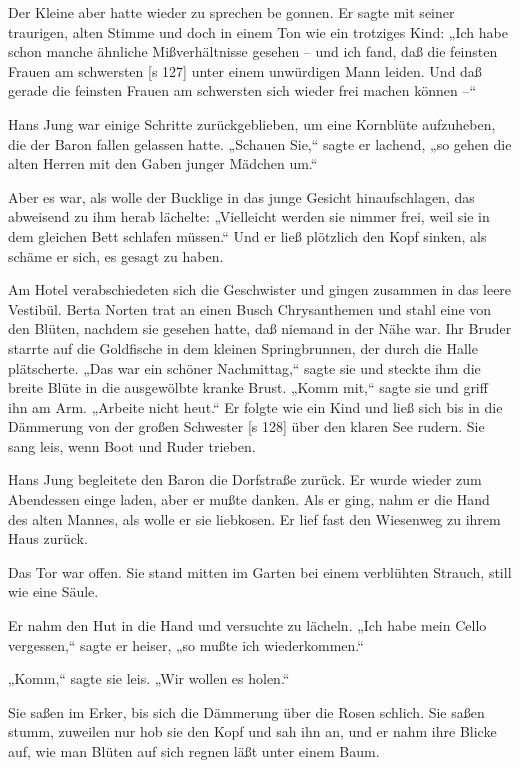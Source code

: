 Der Kleine aber hatte wieder zu sprechen be­
gonnen. Er sagte mit seiner traurigen, alten Stimme
und doch in einem Ton wie ein trotziges Kind: „Ich
habe schon manche ähnliche Mißverhältnisse gesehen
– und ich fand, daß die feinsten Frauen am schwersten
[s 127]
unter einem unwürdigen Mann leiden. Und daß
gerade die feinsten Frauen am schwersten sich wieder
frei machen können –“

Hans Jung war einige Schritte zurückgeblieben,
um eine Kornblüte aufzuheben, die der Baron fallen
gelassen hatte. „Schauen Sie,“ sagte er lachend,
„so gehen die alten Herren mit den Gaben junger
Mädchen um.“

Aber es war, als wolle der Bucklige in das junge
Gesicht hinaufschlagen, das abweisend zu ihm herab­
lächelte: „Vielleicht werden sie nimmer frei, weil sie
in dem gleichen Bett schlafen müssen.“ Und er ließ
plötzlich den Kopf sinken, als schäme er sich, es gesagt
zu haben.

Am Hotel verabschiedeten sich die Geschwister
und gingen zusammen in das leere Vestibül. Berta
Norten trat an einen Busch Chrysanthemen und stahl
eine von den Blüten, nachdem sie gesehen hatte, daß
niemand in der Nähe war. Ihr Bruder starrte auf
die Goldfische in dem kleinen Springbrunnen, der
durch die Halle plätscherte. „Das war ein schöner
Nachmittag,“ sagte sie und steckte ihm die breite
Blüte in die ausgewölbte kranke Brust. „Komm
mit,“ sagte sie und griff ihn am Arm. „Arbeite
nicht heut.“ Er folgte wie ein Kind und ließ sich
bis in die Dämmerung von der großen Schwester
[s 128]
über den klaren See rudern. Sie sang leis, wenn
Boot und Ruder trieben.

Hans Jung begleitete den Baron die Dorfstraße
zurück. Er wurde wieder zum Abendessen einge­
laden, aber er mußte danken. Als er ging, nahm er
die Hand des alten Mannes, als wolle er sie liebkosen.
Er lief fast den Wiesenweg zu ihrem Haus zurück.

Das Tor war offen. Sie stand mitten im Garten
bei einem verblühten Strauch, still wie eine Säule.

Er nahm den Hut in die Hand und versuchte
zu lächeln. „Ich habe mein Cello vergessen,“ sagte
er heiser, „so mußte ich wiederkommen.“

„Komm,“ sagte sie leis. „Wir wollen es holen.“

Sie saßen im Erker, bis sich die Dämmerung
über die Rosen schlich. Sie saßen stumm, zuweilen
nur hob sie den Kopf und sah ihn an, und er nahm
ihre Blicke auf, wie man Blüten auf sich regnen läßt
unter einem Baum.

